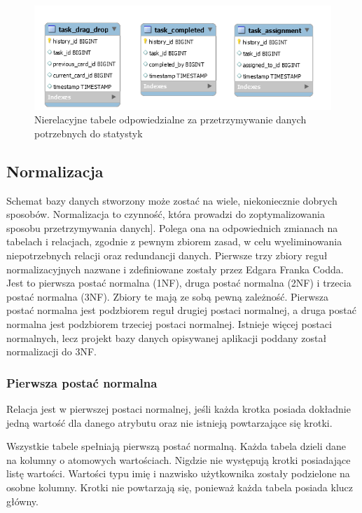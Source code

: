 \begin{figure}[h]
	\centering
	\includegraphics[]{nierelacyjne}
	
	\caption{ Nierelacyjne tabele odpowiedzialne za przetrzymywanie danych potrzebnych do statystyk }
	\label{nierel}
\end{figure}
\clearpage
\subsection{Normalizacja}
Schemat bazy danych stworzony może zostać na wiele, niekoniecznie dobrych sposobów. Normalizacja to czynność, która prowadzi do zoptymalizowania sposobu przetrzymywania danych]. Polega ona na odpowiednich zmianach na tabelach i relacjach, zgodnie z pewnym zbiorem zasad, w celu wyeliminowania niepotrzebnych relacji oraz redundancji danych. Pierwsze trzy zbiory reguł normalizacyjnych nazwane i zdefiniowane zostały przez Edgara Franka Codda. Jest to pierwsza postać normalna (1NF), druga postać normalna (2NF) i trzecia postać normalna (3NF). Zbiory te mają ze sobą pewną zależność. Pierwsza postać normalna jest podzbiorem reguł drugiej postaci normalnej, a druga postać normalna jest podzbiorem trzeciej postaci normalnej. Istnieje więcej postaci normalnych, lecz projekt bazy danych opisywanej aplikacji poddany został normalizacji do 3NF. \cite{db}

\subsubsection{Pierwsza postać normalna}
\begin{definition}
	Relacja jest w pierwszej postaci normalnej, jeśli każda krotka posiada dokładnie jedną wartość dla danego atrybutu oraz nie istnieją powtarzające się krotki.
\end{definition}
Wszystkie tabele spełniają pierwszą postać normalną. Każda tabela dzieli dane na kolumny o atomowych wartościach. Nigdzie nie występują krotki posiadające listę wartości. Wartości typu imię i nazwisko użytkownika zostały podzielone na osobne kolumny. Krotki nie powtarzają się, ponieważ każda tabela posiada klucz główny.

